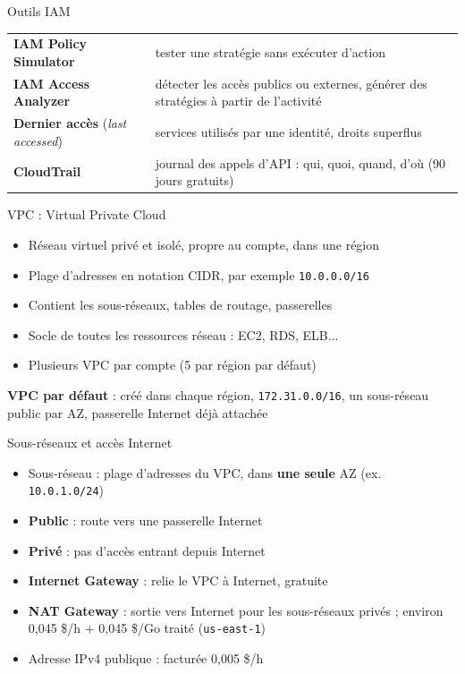 \begin{frame}{Outils IAM}
  \renewcommand{\arraystretch}{1.45}
  \begin{tabularx}{\textwidth}{@{}>{\raggedright\arraybackslash}p{4.6cm}>{\raggedright\arraybackslash}X@{}}
    \toprule
    \textbf{IAM Policy Simulator} & tester une stratégie sans exécuter d'action \\
    \textbf{IAM Access Analyzer} & détecter les accès publics ou externes, générer des stratégies à partir de l'activité \\
    \textbf{Dernier accès} (\emph{last accessed}) & services utilisés par une identité, droits superflus \\
    \textbf{CloudTrail} & journal des appels d'API : qui, quoi, quand, d'où (90 jours gratuits) \\ \bottomrule
  \end{tabularx}
\end{frame}

\begin{frame}{VPC : Virtual Private Cloud}
  \begin{itemize}
    \setlength{\itemsep}{.5em}
    \item Réseau virtuel privé et isolé, propre au compte, dans une région
    \item Plage d'adresses en notation CIDR, par exemple \texttt{10.0.0.0/16}
    \item Contient les sous-réseaux, tables de routage, passerelles
    \item Socle de toutes les ressources réseau : EC2, RDS, ELB...
    \item Plusieurs VPC par compte (5 par région par défaut)
  \end{itemize}
  \bigskip
  \textbf{VPC par défaut} : créé dans chaque région, \texttt{172.31.0.0/16}, un sous-réseau public par AZ, passerelle Internet déjà attachée
\end{frame}

\begin{frame}{Sous-réseaux et accès Internet}
  \begin{itemize}
    \setlength{\itemsep}{.45em}
    \item Sous-réseau : plage d'adresses du VPC, dans \textbf{une seule} AZ (ex. \texttt{10.0.1.0/24})
    \item \textbf{Public} : route vers une passerelle Internet
    \item \textbf{Privé} : pas d'accès entrant depuis Internet
    \item \textbf{Internet Gateway} : relie le VPC à Internet, gratuite
    \item \textbf{NAT Gateway} : sortie vers Internet pour les sous-réseaux privés ; environ 0,045 \$/h + 0,045 \$/Go traité (\texttt{us-east-1})
    \item Adresse IPv4 publique : facturée 0,005 \$/h
  \end{itemize}
\end{frame}


